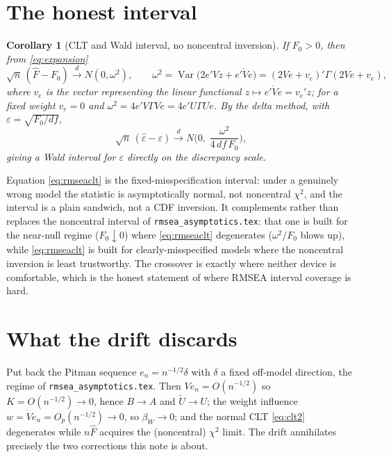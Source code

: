 \documentclass[11pt]{article}
\newcommand{\Var}{\operatorname{Var}}
\newcommand{\rmsea}{\widehat{\varepsilon}}
\newcommand{\dto}{\xrightarrow{d}}
\theoremstyle{plain}
\newtheorem{corollary}{Corollary}
\theoremstyle{remark}
\begin{document}
\section{The honest interval}

\begin{corollary}[CLT and Wald interval, no noncentral inversion]\label{cor:ci}
If $F_0>0$, then from \eqref{eq:expansion}
\begin{equation}\label{eq:clt2}
  \sqrt n\,(\hat F-F_0)\dto N(0,\omega^2),
  \qquad
  \omega^2=\Var\!\big(2e'Vz+e'\dot V e\big)=(2Ve+v_e)'\Gamma(2Ve+v_e),
\end{equation}
where $v_e$ is the vector representing the linear functional $z\mapsto e'\dot V
e=v_e'z$; for a fixed weight $v_e=0$ and $\omega^2=4e'V\Gamma Ve=4e'U\Gamma Ue$.
By the delta method, with $\varepsilon=\sqrt{F_0/df}$,
\begin{equation}\label{eq:rmseaclt}
  \sqrt n\,(\rmsea-\varepsilon)\dto N\!\Big(0,\;\frac{\omega^2}{4\,df\,F_0}\Big),
\end{equation}
giving a Wald interval for $\varepsilon$ directly on the discrepancy scale.
\end{corollary}

Equation \eqref{eq:rmseaclt} is the fixed-misspecification interval: under a
genuinely wrong model the statistic is asymptotically normal, not noncentral
$\chi^2$, and the interval is a plain sandwich, not a CDF inversion. It
complements rather than replaces the noncentral interval of
\texttt{rmsea\_asymptotics.tex}: that one is built for the near-null regime
($F_0\downarrow0$) where \eqref{eq:rmseaclt} degenerates ($\omega^2/F_0$ blows
up), while \eqref{eq:rmseaclt} is built for clearly-misspecified models where the
noncentral inversion is least trustworthy. The crossover is exactly where
neither device is comfortable, which is the honest statement of where RMSEA
interval coverage is hard.

\section{What the drift discards}

Put back the Pitman sequence $e_n=n^{-1/2}\delta$ with $\delta$ a fixed off-model
direction, the regime of \texttt{rmsea\_asymptotics.tex}. Then $Ve_n=O(n^{-1/2})$
so $K=O(n^{-1/2})\to0$, hence $B\to A$ and $\tilde U\to U$; the weight influence
$w=\dot V e_n=O_p(n^{-1/2})\to0$, so $\beta_W\to0$; and the normal CLT
\eqref{eq:clt2} degenerates while $n\hat F$ acquires the (noncentral) $\chi^2$
limit. The drift annihilates precisely the two corrections this note is about.
\end{document}
